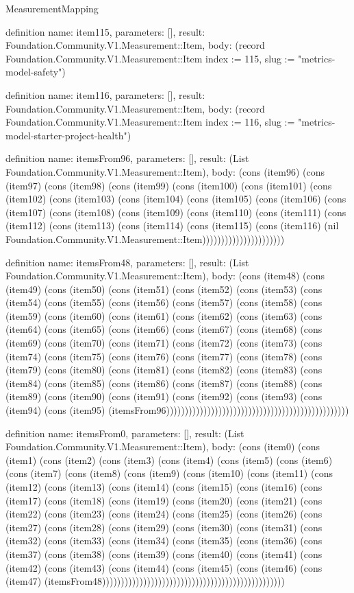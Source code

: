 \begin{lexlean}{MeasurementMapping}
\begin{semanticmodule}
definition{
  name: item115,
  parameters: [],
  result: Foundation.Community.V1.Measurement::Item,
  body: (record Foundation.Community.V1.Measurement::Item {index := 115, slug := "metrics-model-safety"})
}

definition{
  name: item116,
  parameters: [],
  result: Foundation.Community.V1.Measurement::Item,
  body: (record Foundation.Community.V1.Measurement::Item {index := 116, slug := "metrics-model-starter-project-health"})
}

definition{
  name: itemsFrom96,
  parameters: [],
  result: (List Foundation.Community.V1.Measurement::Item),
  body: (cons (item96) (cons (item97) (cons (item98) (cons (item99) (cons (item100) (cons (item101) (cons (item102) (cons (item103) (cons (item104) (cons (item105) (cons (item106) (cons (item107) (cons (item108) (cons (item109) (cons (item110) (cons (item111) (cons (item112) (cons (item113) (cons (item114) (cons (item115) (cons (item116) (nil Foundation.Community.V1.Measurement::Item))))))))))))))))))))))
}

definition{
  name: itemsFrom48,
  parameters: [],
  result: (List Foundation.Community.V1.Measurement::Item),
  body: (cons (item48) (cons (item49) (cons (item50) (cons (item51) (cons (item52) (cons (item53) (cons (item54) (cons (item55) (cons (item56) (cons (item57) (cons (item58) (cons (item59) (cons (item60) (cons (item61) (cons (item62) (cons (item63) (cons (item64) (cons (item65) (cons (item66) (cons (item67) (cons (item68) (cons (item69) (cons (item70) (cons (item71) (cons (item72) (cons (item73) (cons (item74) (cons (item75) (cons (item76) (cons (item77) (cons (item78) (cons (item79) (cons (item80) (cons (item81) (cons (item82) (cons (item83) (cons (item84) (cons (item85) (cons (item86) (cons (item87) (cons (item88) (cons (item89) (cons (item90) (cons (item91) (cons (item92) (cons (item93) (cons (item94) (cons (item95) (itemsFrom96)))))))))))))))))))))))))))))))))))))))))))))))))
}

definition{
  name: itemsFrom0,
  parameters: [],
  result: (List Foundation.Community.V1.Measurement::Item),
  body: (cons (item0) (cons (item1) (cons (item2) (cons (item3) (cons (item4) (cons (item5) (cons (item6) (cons (item7) (cons (item8) (cons (item9) (cons (item10) (cons (item11) (cons (item12) (cons (item13) (cons (item14) (cons (item15) (cons (item16) (cons (item17) (cons (item18) (cons (item19) (cons (item20) (cons (item21) (cons (item22) (cons (item23) (cons (item24) (cons (item25) (cons (item26) (cons (item27) (cons (item28) (cons (item29) (cons (item30) (cons (item31) (cons (item32) (cons (item33) (cons (item34) (cons (item35) (cons (item36) (cons (item37) (cons (item38) (cons (item39) (cons (item40) (cons (item41) (cons (item42) (cons (item43) (cons (item44) (cons (item45) (cons (item46) (cons (item47) (itemsFrom48)))))))))))))))))))))))))))))))))))))))))))))))))
}


\end{semanticmodule}
\end{lexlean}
